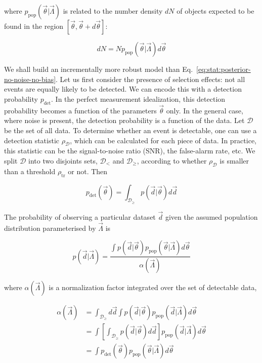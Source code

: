 \documentclass[%
preprint,
nofootinbib,
 amsmath,amssymb,
 aps,
]{revtex4-2}
\newcommand{\given}[2]{p( #1 | #2 )}
\newcommand{\ppop}[0]{p_{\text{pop}}}
\newcommand{\pdet}[0]{p_{\text{det}}}
\begin{document}
where $\ppop(\vec{\theta} | \vec{\Lambda})$ is related to the number density $dN$ of objects
expected to be found in the region $[\vec{\theta}, \vec{\theta} + d\vec{\theta}]$:

\begin{equation}
	\label{eq:stat:ppop}
	dN = N \ppop(\vec{\theta} | \vec{\Lambda}) d\vec{\theta}
\end{equation}

We shall build an incrementally more robust model than
Eq.~\eqref{eq:stat:posterior-no-noise-no-bias}. Let us first consider the presence of selection
effects: not all events are equally likely to be detected. We can encode this with a detection
probability $\pdet$. In the perfect measurement idealization, this detection probability becomes a
function of the parameters $\vec{\theta}$ only. In the general case, where noise is present, the
detection probability is a function of the data. Let $\mathcal{D}$ be the set of all data. To
determine whether an event is detectable, one can use a detection statistic $\rho_{\mathcal{D}}$,
which can be calculated for each piece of data. In practice, this statistic can be the
signal-to-noise ratio (SNR), the false-alarm rate, etc. We split $\mathcal{D}$ into two disjoints
sets, $\mathcal{D}_<$ and $\mathcal{D}_\geq$, according to whether $\rho_\mathcal{D}$ is smaller
than a threshold $\rho_{\text{tr}}$ or not. Then

\begin{equation}
	\label{eq:stat:detection-prob}
	\pdet(\vec{\theta}) = \int_{\mathcal{D}_\geq} \given{\vec{d}}{\vec{\theta}}d\vec{d}
\end{equation}

The probability of observing a particular dataset $\vec{d}$ given the assumed population
distribution parameterised by $\vec{\Lambda}$ is

\begin{equation}
	\given{\vec{d}}{\vec{\Lambda}} =
	\frac{\int \given{\vec{d}}{\vec{\theta}} \ppop(\vec{\theta} | \vec{\Lambda} ) d\vec{\theta}}{\alpha(\vec{\Lambda})}
\end{equation}

where $\alpha(\vec{\Lambda})$ is a normalization factor integrated over the set of detectable data,

\begin{align}
	\alpha(\vec{\Lambda}) & =
	\int_{\mathcal{D}_\geq} d\vec{d} \int \given{\vec{d}}{\vec{\theta}} \ppop(\vec{d} | \vec{\Lambda} ) d\vec{\theta}                                           \\
	                      & = \int \left[ \int_{\mathcal{D}_\geq} \given{\vec{d}}{\vec{\theta}} d\vec{d} \right]  \ppop(\vec{d} | \vec{\Lambda} ) d\vec{\theta} \\
	\label{eq:stat:nalpha}
	                      & = \int \pdet(\vec{\theta}) \ppop(\vec{\theta} | \vec{\Lambda} ) d\vec{\theta}
\end{align}
\end{document}
